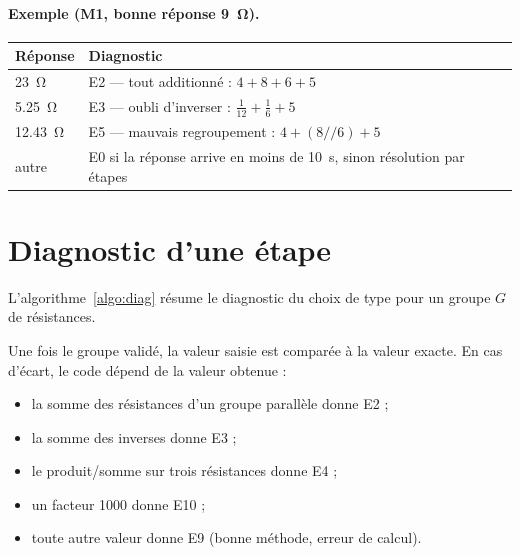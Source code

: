 \documentclass[11pt,a4paper]{report}
\newcommand{\para}{\mathbin{/\!/}}
\begin{document}
\paragraph{Exemple (M1, bonne réponse \SI{9}{\ohm}).}
\begin{center}
\begin{tabular}{ll}
  \toprule
  Réponse & Diagnostic \\
  \midrule
  \SI{23}{\ohm} & E2 — tout additionné : $4 + 8 + 6 + 5$ \\
  \SI{5.25}{\ohm} & E3 — oubli d'inverser : $\frac1{12} + \frac16 + 5$ \\
  \SI{12.43}{\ohm} & E5 — mauvais regroupement : $4 + (8 \para 6) + 5$ \\
  autre & E0 si la réponse arrive en moins de \SI{10}{\second}, sinon résolution par étapes \\
  \bottomrule
\end{tabular}
\end{center}

\section{Diagnostic d'une étape}
L'algorithme~\ref{algo:diag} résume le diagnostic du choix de type pour un groupe $G$ de résistances.

\begin{algorithm}[ht]
\caption{Diagnostic du type choisi pour un groupe}\label{algo:diag}
\end{algorithm}

Une fois le groupe validé, la valeur saisie est comparée à la valeur exacte. En cas d'écart, le code dépend de la valeur obtenue :
\begin{itemize}
  \item la somme des résistances d'un groupe parallèle donne E2 ;
  \item la somme des inverses donne E3 ;
  \item le produit/somme sur trois résistances donne E4 ;
  \item un facteur 1000 donne E10 ;
  \item toute autre valeur donne E9 (bonne méthode, erreur de calcul).
\end{itemize}
\end{document}
